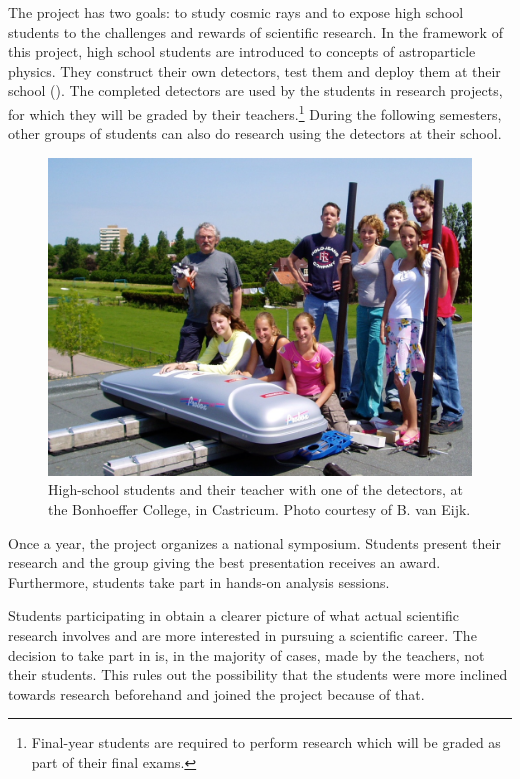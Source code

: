The \hisparc project has two goals: to study cosmic rays and to expose
high school students to the challenges and rewards of scientific research.
In the framework of this project, high school students are introduced to
concepts of astroparticle physics. They construct their own detectors,
test them and deploy them at their school ().  The
completed detectors are used by the students in research projects, for
which they will be graded by their teachers.\footnote{Final-year students
are required to perform research which will be graded as part of their
final exams.}  During the following semesters, other groups of students
can also do research using the detectors at their school.
\begin{figure}
\centering
\includegraphics[width=\linewidth]{figures/students.jpg}
\caption{High-school students and their teacher with one of the \hisparc
detectors, at the Bonhoeffer College, in Castricum.  Photo courtesy of B. van
Eijk.}
\label{fig:students}
\end{figure}

Once a year, the \hisparc project organizes a national symposium. Students
present their research and the group giving the best presentation receives an award.
Furthermore, students take part in hands-on analysis sessions.

Students participating in \hisparc obtain a clearer picture of what
actual scientific research involves and are more interested in pursuing a
scientific career.  The decision to take part in \hisparc is, in the majority
of cases, made by the teachers, not their students.  This rules out the
possibility that the students were more inclined towards research beforehand and
joined the \hisparc project because of that.

